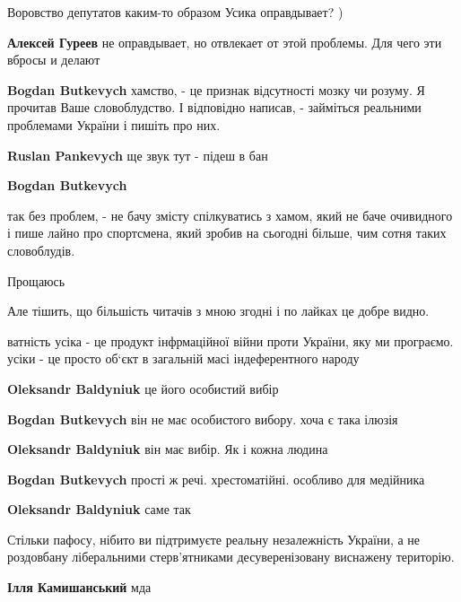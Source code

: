 \begin{itemize}
\begin{itemize}
Воровство депутатов каким-то образом Усика оправдывает? )

\textbf{Алексей Гуреев} не оправдывает, но отвлекает от этой проблемы. Для чего эти вбросы и делают

\textbf{Bogdan Butkevych} хамство, - це признак відсутності мозку чи розуму.
Я прочитав Ваше словоблудство. І відповідно написав, - займіться реальними проблемами України і пишіть про них.

\textbf{Ruslan Pankevych} ще звук тут - підеш в бан

\textbf{Bogdan Butkevych} 

так без проблем, - не бачу змісту спілкуватись з хамом, який не баче очивидного
і пише лайно про спортсмена, який зробив на сьогодні більше, чим сотня таких
словоблудів.

Прощаюсь

Але тішить, що більшість читачів з мною згодні і по лайках це добре видно.

\end{itemize} %


ватність усіка - це продукт інфрмаційної війни проти України, яку ми програємо.
усіки - це просто об‘єкт в загальній масі індеферентного народу

\begin{itemize} %
\textbf{Oleksandr Baldyniuk} це його особистий вибір

\textbf{Bogdan Butkevych} він не має особистого вибору. хоча є така ілюзія


\textbf{Oleksandr Baldyniuk} він має вибір. Як і кожна людина

\textbf{Bogdan Butkevych} прості ж речі. хрестоматійні. особливо для медійника

\textbf{Oleksandr Baldyniuk} саме так
\end{itemize} %


Стільки пафосу, нібито ви підтримуєте реальну незалежність України, а не
роздовбану ліберальними стерв'ятниками десуверенізовану виснажену територію.

\begin{itemize} %
\textbf{Ілля Камишанський} мда


\end{itemize}
\end{itemize}
